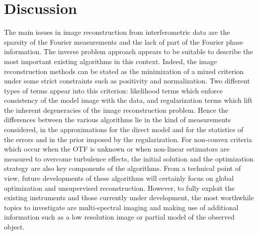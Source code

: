 \documentclass{article}
\begin{document}



\section{Discussion}

The main issues in image reconstruction from interferometric data are the
sparsity of the Fourier measurements and the lack of part of the Fourier phase
information.  The inverse problem approach appears to be suitable to describe
the most important existing algorithms in this context.  Indeed, the image
reconstruction methods can be stated as the minimization of a mixed criterion
under some strict constraints such as positivity and normalization.  Two
different types of terms appear into this criterion: likelihood terms which
enforce consistency of the model image with the data, and regularization terms
which lift the inherent degeneracies of the image reconstruction problem.
Hence the differences between the various algorithms lie in the kind of
measurements considered, in the approximations for the direct model and for
the statistics of the errors and in the prior imposed by the regularization.
For non-convex criteria which occur when the OTF is unknown or when non-linear
estimators are measured to overcome turbulence effects, the initial solution
and the optimization strategy are also key components of the algorithms.  From
a technical point of view, future developments of these algorithms will
certainly focus on global optimization and unsupervised reconstruction.
However, to fully exploit the existing instruments and those currently under
development, the most worthwhile topics to investigate are multi-spectral
imaging and making use of additional information such as a low resolution
image or partial model of the observed object.

\end{document}
